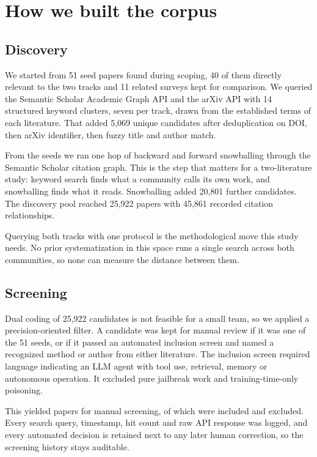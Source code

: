 \section{How we built the corpus}
\label{sec:corpus}

\subsection{Discovery}

We started from 51 seed papers found during scoping, 40 of them directly
relevant to the two tracks and 11 related surveys kept for comparison. We
queried the Semantic Scholar Academic Graph API and the arXiv API with 14
structured keyword clusters, seven per track, drawn from the established terms
of each literature. That added 5,069 unique candidates after deduplication on
DOI, then arXiv identifier, then fuzzy title and author match.

From the seeds we ran one hop of backward and forward snowballing through the
Semantic Scholar citation graph. This is the step that matters for a
two-literature study: keyword search finds what a community calls its own work,
and snowballing finds what it reads. Snowballing added 20,801 further
candidates. The discovery pool reached 25,922 papers with 45,861 recorded
citation relationships.

Querying both tracks with one protocol is the methodological move this study
needs. No prior systematization in this space runs a single search across both
communities, so none can measure the distance between them.

\subsection{Screening}

Dual coding of 25,922 candidates is not feasible for a small team, so we
applied a precision-oriented filter. A candidate was kept for manual review if
it was one of the 51 seeds, or if it passed an automated inclusion screen and
named a recognized method or author from either literature. The inclusion
screen required language indicating an LLM agent with tool use, retrieval,
memory or autonomous operation. It excluded pure jailbreak work and
training-time-only poisoning.

This yielded \NScreened{} papers for manual screening, of which \NCorpus{}
were included and \NExcluded{} excluded. Every search query, timestamp, hit count and raw API response was
logged, and every automated decision is retained next to any later human
correction, so the screening history stays auditable.

